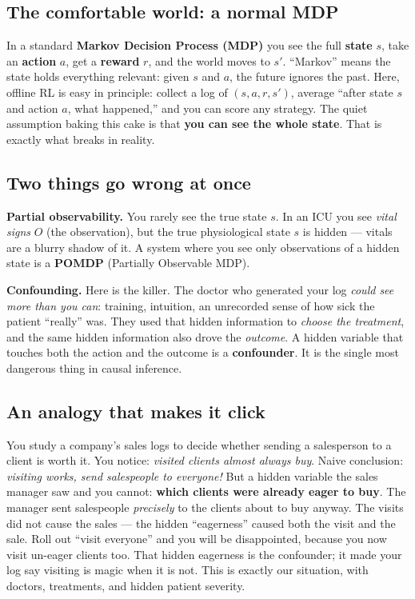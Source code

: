 \documentclass[11pt]{article}
\begin{document}
\subsection{The comfortable world: a normal MDP}
In a standard \textbf{Markov Decision Process (MDP)} you see the full \textbf{state}
$s$, take an \textbf{action} $a$, get a \textbf{reward} $r$, and the world moves to
$s'$. ``Markov'' means the state holds everything relevant: given $s$ and $a$, the
future ignores the past. Here, offline RL is easy in principle: collect a log of
$(s,a,r,s')$, average ``after state $s$ and action $a$, what happened,'' and you can
score any strategy. The quiet assumption baking this cake is that \textbf{you can see
the whole state}. That is exactly what breaks in reality.

\subsection{Two things go wrong at once}
\textbf{Partial observability.} You rarely see the true state $s$. In an ICU you see
\emph{vital signs} $O$ (the observation), but the true physiological state $s$ is
hidden --- vitals are a blurry shadow of it. A system where you see only observations
of a hidden state is a \textbf{POMDP} (Partially Observable MDP).

\textbf{Confounding.} Here is the killer. The doctor who generated your log
\emph{could see more than you can}: training, intuition, an unrecorded sense of how
sick the patient ``really'' was. They used that hidden information to \emph{choose the
treatment}, and the same hidden information also drove the \emph{outcome}. A hidden
variable that touches both the action and the outcome is a \textbf{confounder}. It is
the single most dangerous thing in causal inference.

\subsection{An analogy that makes it click}
You study a company's sales logs to decide whether sending a salesperson to a client
is worth it. You notice: \emph{visited clients almost always buy}. Naive conclusion:
\emph{visiting works, send salespeople to everyone!} But a hidden variable the sales
manager saw and you cannot: \textbf{which clients were already eager to buy}. The
manager sent salespeople \emph{precisely} to the clients about to buy anyway. The
visits did not cause the sales --- the hidden ``eagerness'' caused both the visit and
the sale. Roll out ``visit everyone'' and you will be disappointed, because you now
visit un-eager clients too. That hidden eagerness is the confounder; it made your log
say visiting is magic when it is not. This is exactly our situation, with doctors,
treatments, and hidden patient severity.
\end{document}
